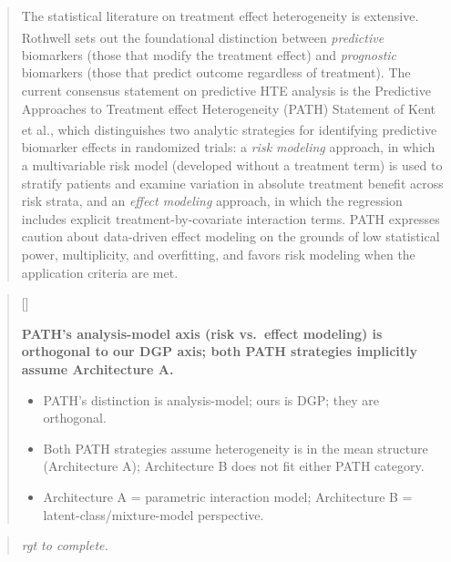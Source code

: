 \documentclass[
  11pt,
]{article}
\newcounter{pgraph}
\newenvironment{bullets}{%
  \stepcounter{pgraph}%
  \begin{quote}\small\sffamily\color[gray]{0.30}%
  {\normalfont\scriptsize\color[gray]{0.58}[\thepgraph]\enspace}}{%
  \end{quote}}
\newenvironment{rgt}{%
  \begin{quote}\small\itshape\color[RGB]{20,60,160}}{%
  \end{quote}}
\newenvironment{orig}{%
  \begin{quote}\normalsize\color[gray]{0.55}}{%
  \end{quote}}
\begin{document}
\begin{orig}
The statistical literature on treatment effect heterogeneity is
extensive. Rothwell\textsuperscript{} sets
out the foundational distinction between \textit{predictive} biomarkers
(those that modify the treatment effect) and \textit{prognostic}
biomarkers (those that predict outcome regardless of treatment). The
current consensus statement on predictive HTE analysis is the Predictive
Approaches to Treatment effect Heterogeneity (PATH) Statement of Kent et
al.\textsuperscript{}, which distinguishes
two analytic strategies for identifying predictive biomarker effects in
randomized trials: a \textit{risk modeling} approach, in which a
multivariable risk model (developed without a treatment term) is used to
stratify patients and examine variation in absolute treatment benefit
across risk strata, and an \textit{effect modeling} approach, in which
the regression includes explicit treatment-by-covariate interaction
terms. PATH expresses caution about data-driven effect modeling on the
grounds of low statistical power, multiplicity, and overfitting, and
favors risk modeling when the application criteria are met.

\end{orig}

\begin{bullets}

\textbf{PATH's analysis-model axis (risk vs.\ effect modeling)
is orthogonal to our DGP axis; both PATH strategies implicitly
assume Architecture A.}

\begin{itemize}\setlength{\itemsep}{2pt}\setlength{\parskip}{0pt}
\item PATH's distinction is analysis-model; ours is DGP; they
  are orthogonal.
\item Both PATH strategies assume heterogeneity is in the mean
  structure (Architecture A); Architecture B does not fit
  either PATH category.
\item Architecture A = parametric interaction model;
  Architecture B = latent-class/mixture-model perspective.
\end{itemize}

\end{bullets}

\begin{rgt}
rgt to complete.

\end{rgt}
\end{document}

